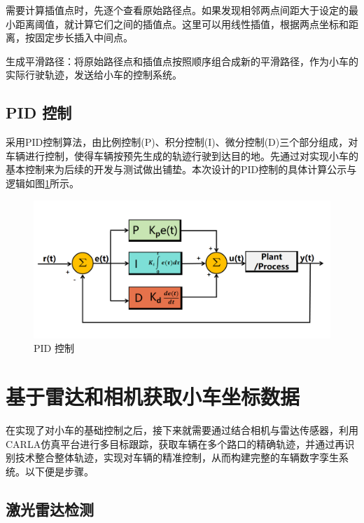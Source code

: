 需要计算插值点时，先逐个查看原始路径点。如果发现相邻两点间距大于设定的最小距离阈值，就计算它们之间的插值点。这里可以用线性插值，根据两点坐标和距离，按固定步长插入中间点。

生成平滑路径：将原始路径点和插值点按照顺序组合成新的平滑路径，作为小车的实际行驶轨迹，发送给小车的控制系统。

\subsection{PID 控制}
采用PID控制算法，由比例控制(P)、积分控制(I)、微分控制(D)三个部分组成，对车辆进行控制，使得车辆按预先生成的轨迹行驶到达目的地。先通过对实现小车的基本控制来为后续的开发与测试做出铺垫。本次设计的PID控制的具体计算公示与逻辑如图\ref{fig:p17}所示。


\begin{figure}[htbp] %
	\centering
	\includegraphics[width=1\textwidth]{p17} %
	\caption{PID 控制} %
	\label{fig:p17} %
\end{figure}






\section{基于雷达和相机获取小车坐标数据}
在实现了对小车的基础控制之后，接下来就需要通过结合相机与雷达传感器，利用CARLA仿真平台进行多目标跟踪，获取车辆在多个路口的精确轨迹，并通过再识别技术整合整体轨迹，实现对车辆的精准控制，从而构建完整的车辆数字孪生系统。以下便是步骤。

\subsection{激光雷达检测}

